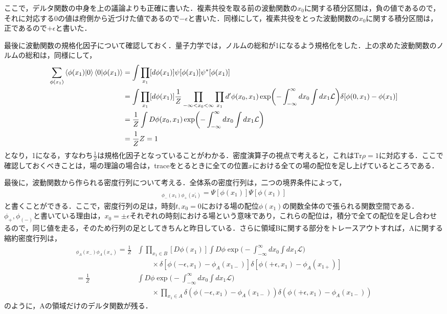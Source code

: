 ここで，デルタ関数の中身を上の議論よりも正確に書いた．複素共役を取る前の波動関数の$x_0$に関する積分区間は，負の値であるので，それに対応する$0$の値は府側から近づけた値であるので$-\epsilon$と書いた．同様にして，複素共役をとった波動関数の$x_0$に関する積分区間は，正であるので$+\epsilon$と書いた．

最後に波動関数の規格化因子について確認しておく．量子力学では，ノルムの総和が1になるよう規格化をした．上の求めた波動関数のノルムの総和は，同様にして，
\begin{align}
  \sum_{\phi(x_1)}\braket{\phi(x_1)|0}\braket{0|\phi(x_1)}&=\int\prod_{x_1}[d\phi(x_1)]\psi[\phi(x_{1})]\psi^{*}[\phi(x_{1})] \\
  &=\int\prod_{x_1}[d\phi(x_1)]\frac{1}{Z}\prod_{-\infty<x_0<\infty}\prod_{x_1}d^{\prime}\phi(x_0,x_1) \exp\biggl(-\int^{\infty}_{-\infty}dx_0\int dx_1\mathcal{L}\biggr)\delta[\phi(0,x_1)-\phi(x_1)]\\
  &=\frac{1}{Z}\int D\phi(x_0,x_1) \exp\biggl(-\int^{\infty}_{-\infty}dx_0\int dx_1\mathcal{L}\biggr)\\
  &=\frac{1}{Z}Z=1
\end{align}
となり，1になる，すなわち$\frac{1}{Z}$は規格化因子となっていることがわかる．密度演算子の視点で考えると，これは$\mathrm{Tr}\rho=1$に対応する．ここで確認しておくべきことは，場の理論の場合は，traceをとるときに全ての位置$x$における全ての場の配位を足し上げているところである．

最後に，波動関数から作られる密度行列について考える．全体系の密度行列は，二つの境界条件によって，
\begin{align}
  [\rho_{tot}]_{\phi_{-}(x_1)\phi_{+}(x_1^{\prime})}=\Psi[\phi(x_1)]\Psi[\phi(x_1)]
\end{align}
と書くことができる．ここで，密度行列の足は，時刻$t,x_0=0$における場の配位$\phi(x_1)$の関数全体ので張られる関数空間である．$\phi_{+},\phi_(-)$と書いている理由は，$x_0=\pm\epsilon$それぞれの時刻における場という意味であり，これらの配位は，積分で全ての配位を足し合わせるので，同じ値を走る，そのため行列の足としてきちんと昨日している．さらに領域Bに関する部分をトレースアウトすれば，Aに関する縮約密度行列は，
\begin{align}
  [\rho_{A}]_{\phi_A(x_-)\phi_A(x_+)}=\frac{1}{Z}&\int\prod_{x_1 \in B}[D\phi(x_1)]\int D\phi \exp\biggl(-\int_{-\infty}^{\infty}dx_0\int dx_1\mathcal{L}\biggr)\nonumber \\
  &\qquad \times\delta[\phi(-\epsilon,x_1)-\phi_{A}(x_{1-})]\delta[\phi(+\epsilon,x_1)-\phi_{A}(x_{1+})] \\
  =\frac{1}{Z}&\int D\phi \exp\biggl(-\int_{-\infty}^{\infty}dx_0\int dx_1\mathcal{L}\biggr)\\
  &\qquad
  \times\prod_{x_1\in A}\delta(\phi(-\epsilon,x_1)-\phi_{A}(x_{1-}))\delta(\phi(+\epsilon,x_1)-\phi_{A}(x_{1-}))
\end{align}
のように，Aの領域だけのデルタ関数が残る．
